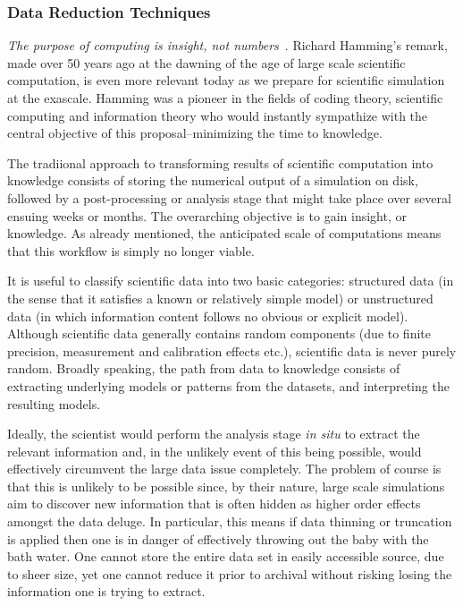 \subsubsection{Data Reduction Techniques}

{\em The purpose of computing is insight, not numbers}~\cite{Hamming:book}.
Richard Hamming's remark, made over 50 years ago at the dawning of the age of
large scale scientific computation, is even more relevant today as we prepare
for scientific simulation at the exascale. Hamming was a pioneer in the fields
of coding theory, scientific computing and information theory who would
instantly sympathize with the central objective of this proposal--minimizing
the time to knowledge. 

The tradiional approach to transforming results of scientific computation into
knowledge consists of storing the numerical output of a simulation on disk,
followed by a post-processing or analysis stage that might take place over
several ensuing weeks or months. The overarching objective is to gain insight,
or knowledge.  As already mentioned, the anticipated scale of computations
means that this workflow is simply no longer viable.

It is useful to classify scientific data into two basic categories: structured
data (in the sense that it satisfies a known or relatively simple model) or
unstructured data (in which information content follows no obvious or explicit
model).  Although scientific data generally contains random components (due to
finite precision, measurement and calibration effects etc.), scientific data is
never purely random. Broadly speaking, the path from data to knowledge consists
of extracting underlying models or patterns from the datasets, and interpreting
the resulting models. 

Ideally, the scientist would perform the analysis stage {\em in situ} to
extract the relevant information and, in the unlikely event of this being
possible, would effectively circumvent the large data issue completely.  The
problem of course is that this is unlikely to be possible since, by their
nature, large scale simulations aim to discover new information that is often
hidden as higher order effects amongst the data deluge. In particular, this
means if data thinning or truncation is applied then one is in danger of
effectively throwing out the baby with the bath water. One cannot store the
entire data set in easily accessible source, due to sheer size, yet one cannot
reduce it prior to archival without risking losing the information one is
trying to extract.  

